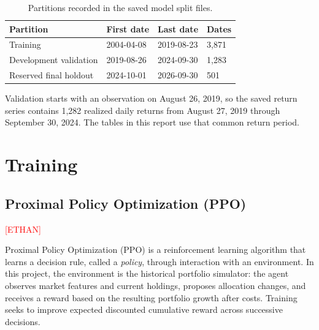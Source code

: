 \documentclass[11pt,letterpaper]{article}
\begin{document}
\begin{table}[htbp]
\centering
\small
\begin{tabular}{@{}llll@{}}
\toprule
Partition & First date & Last date & Dates \\
\midrule
Training & 2004-04-08 & 2019-08-23 & 3,871 \\
Development validation & 2019-08-26 & 2024-09-30 & 1,283 \\
Reserved final holdout & 2024-10-01 & 2026-09-30 & 501 \\
\bottomrule
\end{tabular}
\caption{Partitions recorded in the saved model split files.}
\end{table}

Validation starts with an observation on August 26, 2019, so the saved return
series contains 1,282 realized daily returns from August 27, 2019 through September
30, 2024. The tables in this report use that common return period.

\section{Training}

\subsection{Proximal Policy Optimization (PPO)}

\textcolor{red}{[ETHAN]}

Proximal Policy Optimization (PPO) is a reinforcement learning algorithm that
learns a decision rule, called a \emph{policy}, through interaction with an
environment. In this project, the environment is the historical portfolio
simulator: the agent observes market features and current holdings, proposes
allocation changes, and receives a reward based on the resulting portfolio
growth after costs. Training seeks to improve expected discounted cumulative
reward across successive decisions.
\end{document}
